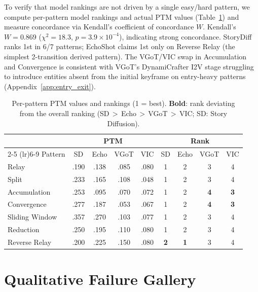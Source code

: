 \documentclass[sigconf,review,anonymous]{acmart}
\begin{document}
To verify that model rankings are not driven by a single easy/hard pattern, we compute per-pattern model rankings and actual PTM values (Table~\ref{tab:rank_pattern}) and measure concordance via Kendall's coefficient of concordance $W$. Kendall's $W = 0.869$ ($\chi^2 = 18.3$, $p = 3.9 \times 10^{-4}$), indicating strong concordance.
StoryDiff ranks 1st in 6/7 patterns; EchoShot claims 1st only on Reverse Relay (the simplest 2-transition derived pattern).
The VGoT/VIC swap in Accumulation and Convergence is consistent with VGoT's DynamiCrafter I2V stage struggling to introduce entities absent from the initial keyframe on entry-heavy patterns (Appendix~\ref{app:entry_exit}).
\begin{table}[H]
\caption{Per-pattern PTM values and rankings (1 = best). \textbf{Bold}: rank deviating from the overall ranking (SD\,$>$\,Echo\,$>$\,VGoT\,$>$\,VIC; SD: Story Diffusion).}
\label{tab:rank_pattern}
\centering
\small
\setlength{\tabcolsep}{3pt}
\begin{tabular}{@{}l cccc cccc@{}}
\toprule
& \multicolumn{4}{c}{PTM} & \multicolumn{4}{c}{Rank} \\
\cmidrule(lr){2-5} \cmidrule(lr){6-9}
Pattern & SD & Echo & VGoT & VIC & SD & Echo & VGoT & VIC \\
\midrule
Relay           & .190 & .138 & .085 & .080 & 1 & 2 & 3 & 4 \\
Split           & .233 & .165 & .108 & .048 & 1 & 2 & 3 & 4 \\
Accumulation    & .253 & .095 & .070 & .072 & 1 & 2 & \textbf{4} & \textbf{3} \\
Convergence     & .277 & .187 & .053 & .067 & 1 & 2 & \textbf{4} & \textbf{3} \\
Sliding Window & .357 & .270 & .103 & .077 & 1 & 2 & 3 & 4 \\
Reduction       & .250 & .195 & .110 & .080 & 1 & 2 & 3 & 4 \\
Reverse Relay   & .200 & .225 & .150 & .080 & \textbf{2} & \textbf{1} & 3 & 4 \\
\bottomrule
\end{tabular}
\end{table}


\section{Qualitative Failure Gallery}
\label{app:qualitative_gallery}
\end{document}

